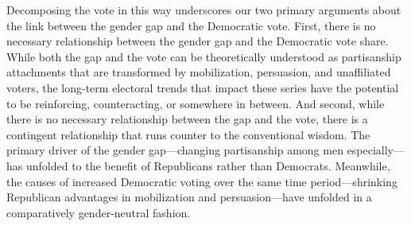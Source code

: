 \documentclass[12pt
               ,final
               ]{article}
\begin{document}
Decomposing the vote in this way underscores our two primary arguments about the link between the gender gap and the Democratic vote. First, there is no necessary relationship between the gender gap and the Democratic vote share. While both the gap and the vote can be theoretically understood as partisanship attachments that are transformed by mobilization, persuasion, and unaffiliated voters, the long-term electoral trends that impact these series have the potential to be reinforcing, counteracting, or somewhere in between. And second, while there is no necessary relationship between the gap and the vote, there is a contingent relationship that runs counter to the conventional wisdom. The primary driver of the gender gap---changing partisanship among men especially---has unfolded to the benefit of Republicans rather than Democrats. Meanwhile, the causes of increased Democratic voting over the same time period---shrinking Republican advantages in mobilization and persuasion---have unfolded in a comparatively gender-neutral fashion.
















\end{document}
